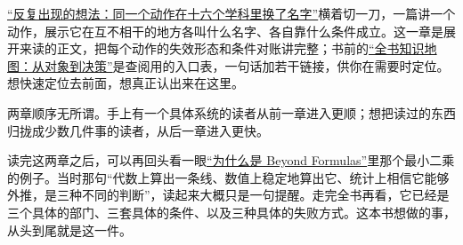 \hyperref[ch:149]{``反复出现的想法：同一个动作在十六个学科里换了名字''}横着切一刀，一篇讲一个动作，展示它在互不相干的地方各叫什么名字、各自靠什么条件成立。这一章是展开来读的正文，把每个动作的失效形态和条件对账讲完整；书前的\hyperref[ch:002]{``全书知识地图：从对象到决策''}是查阅用的入口表，一句话加若干链接，供你在需要时定位。想快速定位去前面，想真正认出来在这里。

两章顺序无所谓。手上有一个具体系统的读者从前一章进入更顺；想把读过的东西归拢成少数几件事的读者，从后一章进入更快。

读完这两章之后，可以再回头看一眼\hyperref[ch:001]{``为什么是 Beyond Formulas''}里那个最小二乘的例子。当时那句``代数上算出一条线、数值上稳定地算出它、统计上相信它能够外推，是三种不同的判断''，读起来大概只是一句提醒。走完全书再看，它已经是三个具体的部门、三套具体的条件、以及三种具体的失败方式。这本书想做的事，从头到尾就是这一件。
